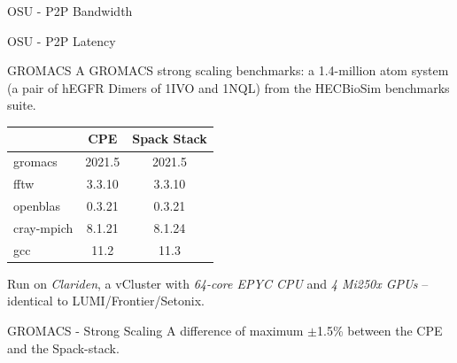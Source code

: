 \documentclass[aspectratio=43]{beamer}
\begin{document}
\begin{frame}[fragile]{OSU - P2P Bandwidth}
    \begin{center}
        
    \end{center}
\end{frame}

\begin{frame}[fragile]{OSU - P2P Latency}
    \begin{center}
        
    \end{center}
\end{frame}

\begin{frame}[fragile]{GROMACS}
    A GROMACS strong scaling benchmarks: a 1.4-million atom system (a pair of hEGFR Dimers of 1IVO and 1NQL) from the HECBioSim benchmarks suite.
\begin{center}
    \begin{tabular}{|l |c  c| }
        \cline{2-3}
\multicolumn{1}{c|}{} & CPE   & Spack Stack \\
        \hline
        gromacs       & 2021.5   & 2021.5   \\
        fftw          & 3.3.10   & 3.3.10   \\
        openblas      & 0.3.21   & 0.3.21   \\
        cray-mpich    & 8.1.21   & 8.1.24   \\
        gcc           & 11.2     & 11.3     \\
          \hline
    \end{tabular}
\end{center}

    Run on \emph{Clariden}, a vCluster with \emph{64-core EPYC CPU} and  \emph{4 Mi250x GPUs} -- identical to LUMI/Frontier/Setonix.
\end{frame}

\begin{frame}[fragile]{GROMACS - Strong Scaling}
    A difference of maximum $\pm$1.5\% between the CPE and the Spack-stack.
    \begin{center}
        
    \end{center}
\end{frame}
\end{document}
